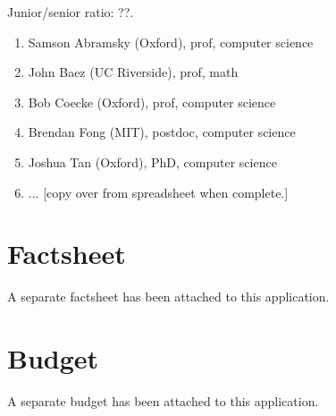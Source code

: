 \documentclass{article}
\newcommand{\redout}[1]{{\color{red}#1}}
\begin{document}
Junior/senior ratio: \redout{??}.

\begin{enumerate}
\item Samson Abramsky (Oxford), prof, computer science
\item John Baez (UC Riverside), prof, math
\item Bob Coecke (Oxford), prof, computer science
\item Brendan Fong (MIT), postdoc, computer science
\item Joshua Tan (Oxford), PhD, computer science
\item \redout{... [copy over from spreadsheet when complete.]}
\end{enumerate}

\section{Factsheet}
A separate factsheet has been attached to this application.

\section{Budget}
A separate budget has been attached to this application.


 
\end{document}
